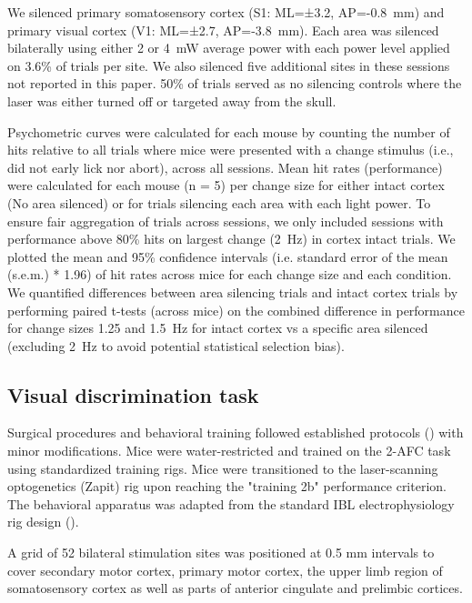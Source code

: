 \documentclass[9pt,lineno]{elife}
\begin{document}
We silenced primary somatosensory cortex (S1: ML=±3.2, AP=-0.8~mm) and primary visual cortex (V1: ML=±2.7, AP=-3.8~mm).
Each area was silenced bilaterally using either 2 or 4~mW average power with each power level applied on 3.6\% of trials per site.
We also silenced five additional sites in these sessions not reported in this paper. 50\% of trials served as no silencing controls where the laser was either turned off or targeted away from the skull.

Psychometric curves were calculated for each mouse by counting the number of hits relative to all trials where mice were presented with a change stimulus (i.e., did not early lick nor abort), across all sessions.
Mean hit rates (performance) were calculated for each mouse (n = 5) per change size for either intact cortex (No area silenced) or for trials silencing each area with each light power.
To ensure fair aggregation of trials across sessions, we only included sessions with performance above 80\% hits on largest change (2~Hz) in cortex intact trials.
We plotted the mean and  95\% confidence intervals (i.e. standard error of the mean (s.e.m.) * 1.96) of hit rates across mice for each change size and each condition.
We quantified differences between area silencing trials and intact cortex trials by performing paired t-tests (across mice) on the combined difference in performance for change sizes 1.25 and 1.5~Hz for intact cortex vs a specific area silenced (excluding 2~Hz to avoid potential statistical selection bias).


\subsection{Visual discrimination task}

Surgical procedures and behavioral training followed established protocols (\citealp{InternationalBrainLaboratory2021StandardizedMice,InternationalBrainLaboratory2025ABehaviour}) with minor modifications.
Mice were water-restricted and trained on the 2-AFC task using standardized training rigs.
Mice were transitioned to the laser-scanning optogenetics (Zapit) rig upon reaching the "training 2b" performance criterion.
The behavioral apparatus was adapted from the standard IBL electrophysiology rig design (\citealp{InternationalBrainLaboratory2021StandardizedMice}).

A grid of 52 bilateral stimulation sites was positioned at 0.5 mm intervals to cover secondary motor cortex, primary motor cortex, the upper limb region of somatosensory cortex as well as parts of anterior cingulate and prelimbic cortices.
\end{document}
